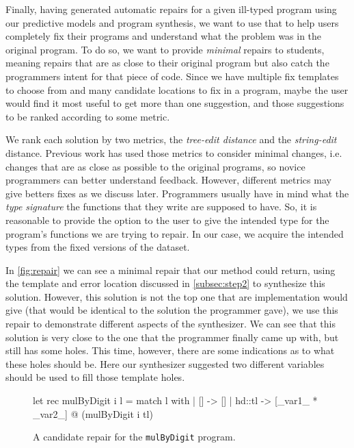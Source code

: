 Finally, having generated automatic repairs for a given ill-typed program using
our predictive models and program synthesis, we want to use that to help users
completely fix their programs and understand what the problem was in the
original program. To do so, we want to provide \emph{minimal} repairs to
students, meaning repairs that are as close to their original program but also
catch the programmers intent for that piece of code. Since we have multiple fix
templates to choose from and many candidate locations to fix in a program, maybe
the user would find it most useful to get more than one suggestion, and those
suggestions to be ranked according to some metric.

 We rank each solution by two metrics, the
\emph{tree-edit distance} and the \emph{string-edit} distance. Previous work has
used those metrics to consider minimal changes, i.e. changes that are as close
as possible to the original programs, so novice programmers can better
understand feedback. However, different metrics may give betters fixes as we
discuss later. Programmers usually have in mind what the \emph{type signature}
the functions that they write are supposed to have. So, it is reasonable to
provide the option to the user to give the intended type for the program's
functions we are trying to repair. In our case, we acquire the intended types
from the fixed versions of the dataset.

 In \autoref{fig:repair} we can see a minimal repair that our
method could return, using the template and error location discussed in
\autoref{subsec:step2} to synthesize this solution. However, this solution is
not the top one that are implementation would give (that would be identical to
the solution the programmer gave), we use this repair to demonstrate different
aspects of the synthesizer. We can see that this solution is very close to the
one that the programmer finally came up with, but still has some holes. This
time, however, there are some indications as to what these holes should be. Here
our synthesizer suggested two different variables should be used to fill those
template holes.

\begin{figure}[ht]
\begin{ecode}
let rec mulByDigit i l =
  match l with
  | []     -> []
  | hd::tl -> [_var1_ * _var2_] @ (mulByDigit i tl)
\end{ecode}
\caption{A candidate repair for the \texttt{mulByDigit} program.}
\label{fig:repair}
\end{figure}
